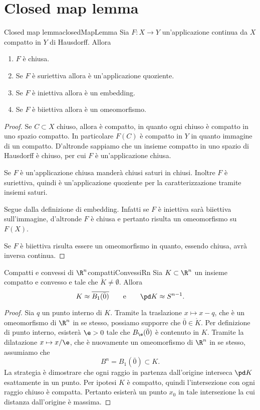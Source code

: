 \section{Closed map lemma}

\begin{teor}{Closed map lemma}{closedMapLemma}
	Sia \(F\colon X \to Y\) un'applicazione continua da \(X\) compatto in \(Y\) di Hausdorff.
	Allora
	\begin{enumerate}
		\item \(F\) è chiusa.
		\item Se \(F\) è suriettiva allora è un'applicazione quoziente.
		\item Se \(F\) è iniettiva allora è un embedding.
		\item Se \(F\) è biiettiva allora è un omeomorfismo.
	\end{enumerate}
\end{teor}

\begin{proof}
	Se \(C\subset X\) chiuso, allora è compatto, in quanto ogni chiuso è compatto in uno spazio compatto.
	In particolare \(F(C)\) è compatto in \(Y\) in quanto immagine di un compatto.
	D'altronde sappiamo che un insieme compatto in uno spazio di Hausdorff è chiuso, per cui \(F\) è un'applicazione chiusa.

	Se \(F\) è un'applicazione chiusa manderà chiusi saturi in chiusi.
	Inoltre \(F\) è suriettiva, quindi è un'applicazione quoziente per la caratterizzazione tramite insiemi saturi.

	Segue dalla definizione di embedding.
	Infatti se \(F\) è iniettiva sarà biiettiva sull'immagine, d'altronde \(F\) è chiusa e pertanto risulta un omeomorfismo su \(F(X)\).

	Se \(F\) è biiettiva risulta essere un omeomorfismo in quanto, essendo chiusa, avrà inversa continua.
\end{proof}

\begin{prop}{Compatti e convessi di \(\R^n\)}{compattiConvessiRn}
	Sia \(K\subset \R^n\) un insieme compatto e convesso e tale che \(\mathring{K}\neq \emptyset\).
	Allora
	\[
		K \approx \overline{B_1(\bar{0})} \qquad\text{e}\qquad \pd K \approx S^{n-1}.
	\]
\end{prop}

\begin{proof}
	Sia \(q\) un punto interno di \(K\).
	Tramite la traslazione \(x\mapsto x-q\), che è un omeomorfismo di \(\R^n\) in se stesso, possiamo supporre che \(\bar{0}\in \mathring{K}\).
	Per definizione di punto interno, esisterà \(\e>0\) tale che \(B_\e(\bar{0})\) è contenuto in \(K\).
	Tramite la dilatazione \(x\mapsto x/\e\), che è nuovamente un omeomorfismo di \(\R^n\) in se stesso, assumiamo che
	\[
		B^n = B_1(\bar{0})\subset K.
	\]
	La strategia è dimostrare che ogni raggio in partenza dall'origine interseca \(\pd K\) esattamente in un punto.
	Per ipotesi \(K\) è compatto, quindi l'intersezione con ogni raggio chiuso è compatta.
	Pertanto esisterà un punto \(x_0\) in tale intersezione la cui distanza dall'origine è massima.
\end{proof}